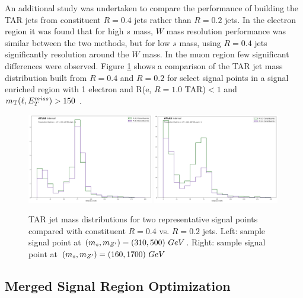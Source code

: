 An additional study was undertaken to compare the performance of building the TAR jets from constituent \akt $R=0.4$ jets rather than \akt $R=0.2$ jets.
In the electron region it was found that for high $s$ mass, $W$ mass resolution performance was similar between the two methods, but for low $s$ mass, using \akt $R=0.4$ jets significantly resolution around the $W$ mass.
In the muon region few significant differences were observed.
Figure \ref{fig:R04_TAR_plots} shows a comparison of the TAR jet mass distribution built from \akt $R=0.4$ and \akt $R=0.2$ for select signal points in a signal enriched region with 1 electron and \Delta R(e, $R=1.0$ TAR)$< 1$ and $m_{\text{T}}(\ell, E_{T}^{miss}) > 150$ \GeV.

\begin{figure}[htpb]
  \centering
     \includegraphics[width = 0.49\textwidth]{figures/4/TAR/04_monoSww_semilep_zp500_dm200_dh310.png}
     \includegraphics[width = 0.49\textwidth]{figures/4/TAR/04_monoSww_semilep_zp1700_dm200_dh160.png}

     \caption{TAR jet mass distributions for two representative signal points compared with constituent \akt $R=0.4$ vs. \akt $R=0.2$ jets. Left: sample signal point at $(m_s, m_{Z^\prime})=(310, 500)~GeV$. Right: sample signal point at $(m_s, m_{Z^\prime})=(160, 1700)~GeV$}
     \label{fig:R04_TAR_plots}
\end{figure}


\subsection{Merged Signal Region Optimization}
